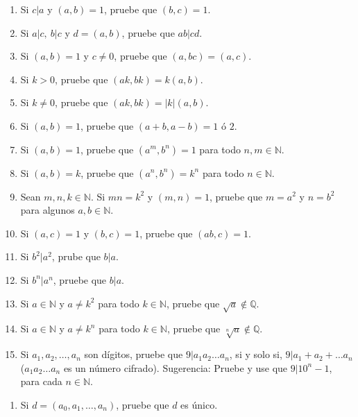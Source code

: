 \documentclass[11pt]{article}
\newcommand{\N}{\mathbb{N}}
\newcommand{\Q}{\mathbb{Q}}
\begin{document}
\begin{enumerate}[start=2]
  \item Si $c|a$ y $(a,b)=1$, pruebe que $(b,c)=1$.
  \item Si $a|c, \ b|c$ y $d=(a,b)$, pruebe que $ab|cd$.
  \item Si $(a,b)=1$ y $c \neq 0$, pruebe que $(a,bc)=(a,c)$.
  \item Si $k>0$, pruebe que $(ak,bk)=k(a,b)$.
  \item Si $k \neq 0$, pruebe que $(ak,bk)=|k|(a,b)$.
  \item Si $(a,b)=1$, pruebe que $(a+b,a-b)=1$ ó $2$.
  \item Si $(a,b)=1$, pruebe que $(a^m,b^n)=1$ para todo $n,m\in \N$.
  \item Si $(a,b)=k$, pruebe que $(a^n,b^n)=k^n$ para todo $n\in\N$.
  \item Sean $m,n,k\in \N$. Si $mn=k^2$ y $(m,n)=1$, pruebe que $m=a^2$ y $n=b^2$ para algunos $a,b\in \N$.
  \item Si $(a,c)=1$ y $(b,c)=1$, pruebe que $(ab,c)=1$.
  \item Si $b^2|a^2$, prube que $b|a$.
  \item Si $b^n|a^n$, pruebe que $b|a$.
  \item Si $a\in \N$ y $a\neq k^2$ para todo $k\in \N$, pruebe que $\sqrt{a} \notin \Q$.
  \item Si $a\in \N$ y $a\neq k^n$ para todo $k\in \N$, pruebe que $\sqrt[n]{a} \notin \Q$.
  \item Si $a_1,a_2,\dots, a_n$ son dígitos, pruebe que $9|a_1a_2\dots a_n$, si y solo si, $9|a_1+a_2+\dots a_n$ ($a_1a_2\dots a_n$ es un número cifrado). Sugerencia: Pruebe y use que $9|10^n-1$, para cada $n\in\N$.
\end{enumerate}

\begin{enumerate}[label=30.1]
  \item Si $d=(a_0,a_1,\dots,a_n)$, pruebe que $d$  es único.
\end{enumerate}
\end{document}
